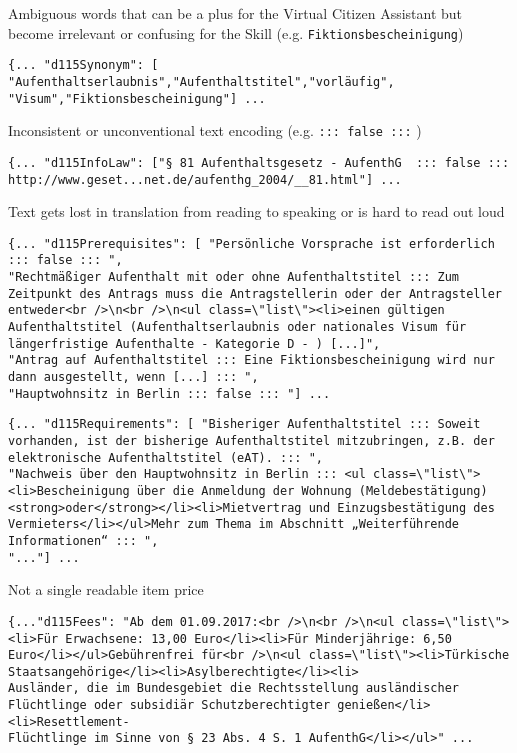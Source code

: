 Ambiguous words that can be a plus for the Virtual Citizen Assistant but become irrelevant or confusing for the Skill (e.g. \texttt{Fiktionsbescheinigung})
\begin{verbatim}
{... "d115Synonym": [
"Aufenthaltserlaubnis","Aufenthaltstitel","vorläufig",
"Visum","Fiktionsbescheinigung"] ...
\end{verbatim}

Inconsistent or unconventional text encoding (e.g. \texttt{::: false :::} )
\begin{verbatim}
{... "d115InfoLaw": ["§ 81 Aufenthaltsgesetz - AufenthG  ::: false ::: http://www.geset...net.de/aufenthg_2004/__81.html"] ...
\end{verbatim}

Text gets lost in translation from reading to speaking or is hard to read out loud
\begin{verbatim}
{... "d115Prerequisites": [ "Persönliche Vorsprache ist erforderlich ::: false ::: ",
"Rechtmäßiger Aufenthalt mit oder ohne Aufenthaltstitel ::: Zum Zeitpunkt des Antrags muss die Antragstellerin oder der Antragsteller entweder<br />\n<br />\n<ul class=\"list\"><li>einen gültigen Aufenthaltstitel (Aufenthaltserlaubnis oder nationales Visum für längerfristige Aufenthalte - Kategorie D - ) [...]",
"Antrag auf Aufenthaltstitel ::: Eine Fiktionsbescheinigung wird nur dann ausgestellt, wenn [...] ::: ",
"Hauptwohnsitz in Berlin ::: false ::: "] ...
\end{verbatim}

\begin{verbatim}
{... "d115Requirements": [ "Bisheriger Aufenthaltstitel ::: Soweit vorhanden, ist der bisherige Aufenthaltstitel mitzubringen, z.B. der elektronische Aufenthaltstitel (eAT). ::: ",
"Nachweis über den Hauptwohnsitz in Berlin ::: <ul class=\"list\"><li>Bescheinigung über die Anmeldung der Wohnung (Meldebestätigung) <strong>oder</strong></li><li>Mietvertrag und Einzugsbestätigung des Vermieters</li></ul>Mehr zum Thema im Abschnitt „Weiterführende Informationen“ ::: ",
"..."] ...
\end{verbatim}

Not a single readable item price
\begin{verbatim}
{..."d115Fees": "Ab dem 01.09.2017:<br />\n<br />\n<ul class=\"list\"><li>Für Erwachsene: 13,00 Euro</li><li>Für Minderjährige: 6,50 Euro</li></ul>Gebührenfrei für<br />\n<ul class=\"list\"><li>Türkische Staatsangehörige</li><li>Asylberechtigte</li><li>
Ausländer, die im Bundesgebiet die Rechtsstellung ausländischer Flüchtlinge oder subsidiär Schutzberechtigter genießen</li><li>Resettlement-
Flüchtlinge im Sinne von § 23 Abs. 4 S. 1 AufenthG</li></ul>" ...
\end{verbatim}

